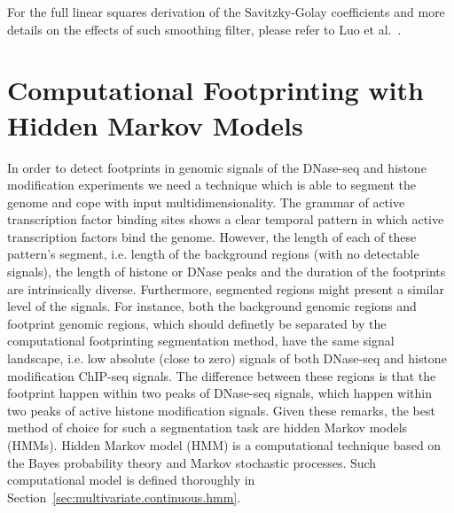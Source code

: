 For the full linear squares derivation of the Savitzky-Golay coefficients and more details on the effects of such smoothing filter, please refer to Luo et al.~\cite{luo2005}.

\section{Computational Footprinting with Hidden Markov Models}
\label{sec:computational.footprinting.hmm}

In order to detect footprints in genomic signals of the DNase-seq and histone modification experiments we need a technique which is able to segment the genome and cope with input multidimensionality. The grammar of active transcription factor binding sites shows a clear temporal pattern in which active transcription factors bind the genome. However, the length of each of these pattern's segment, i.e. length of the background regions (with no detectable signals), the length of histone or DNase peaks and the duration of the footprints are intrinsically diverse. Furthermore, segmented regions might present a similar level of the signals. For instance, both the background genomic regions and footprint genomic regions, which should definetly be separated by the computational footprinting segmentation method, have the same signal landscape, i.e. low absolute (close to zero) signals of both DNase-seq and histone modification ChIP-seq signals. The difference between these regions is that the footprint happen within two peaks of DNase-seq signals, which happen within two peaks of active histone modification signals. Given these remarks, the best method of choice for such a segmentation task are hidden Markov models (HMMs). Hidden Markov model (HMM) is a computational technique based on the Bayes probability theory and Markov stochastic processes. Such computational model is defined thoroughly in Section~\ref{sec:multivariate.continuous.hmm}.

